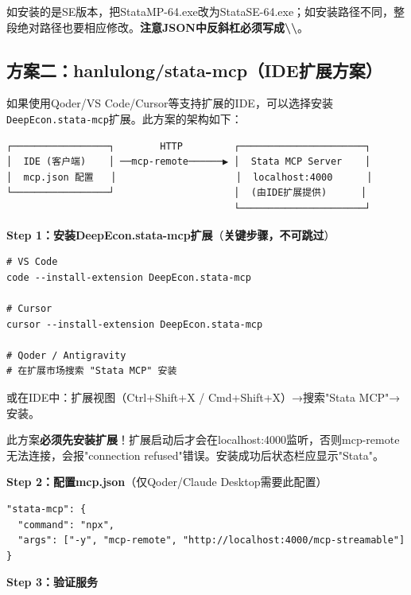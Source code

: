 \begin{notebox}[路径注意]
如安装的是SE版本，把StataMP-64.exe改为StataSE-64.exe；如安装路径不同，整段绝对路径也要相应修改。\textbf{注意JSON中反斜杠必须写成\textbackslash\textbackslash}。
\end{notebox}

\subsection{方案二：hanlulong/stata-mcp（IDE扩展方案）}

如果使用Qoder/VS Code/Cursor等支持扩展的IDE，可以选择安装\texttt{DeepEcon.stata-mcp}扩展。此方案的架构如下：

\begin{verbatim}
┌─────────────────┐        HTTP         ┌──────────────────────┐
│  IDE (客户端)    │ ──mcp-remote──────▶ │  Stata MCP Server    │
│  mcp.json 配置   │                     │  localhost:4000      │
└─────────────────┘                     │  (由IDE扩展提供)      │
                                        └──────────────────────┘
\end{verbatim}

\textbf{Step 1：安装DeepEcon.stata-mcp扩展}（\textbf{关键步骤，不可跳过}）

\begin{lstlisting}[style=shell]
# VS Code
code --install-extension DeepEcon.stata-mcp

# Cursor
cursor --install-extension DeepEcon.stata-mcp

# Qoder / Antigravity
# 在扩展市场搜索 "Stata MCP" 安装
\end{lstlisting}

或在IDE中：扩展视图（Ctrl+Shift+X / Cmd+Shift+X）→搜索"Stata MCP"→安装。

\begin{warningbox}[重要提醒]
此方案\textbf{必须先安装扩展}！扩展启动后才会在localhost:4000监听，否则mcp-remote无法连接，会报"connection refused"错误。安装成功后状态栏应显示"Stata"。
\end{warningbox}

\textbf{Step 2：配置mcp.json}（仅Qoder/Claude Desktop需要此配置）

\begin{lstlisting}[style=json]
"stata-mcp": {
  "command": "npx",
  "args": ["-y", "mcp-remote", "http://localhost:4000/mcp-streamable"]
}
\end{lstlisting}

\textbf{Step 3：验证服务}

